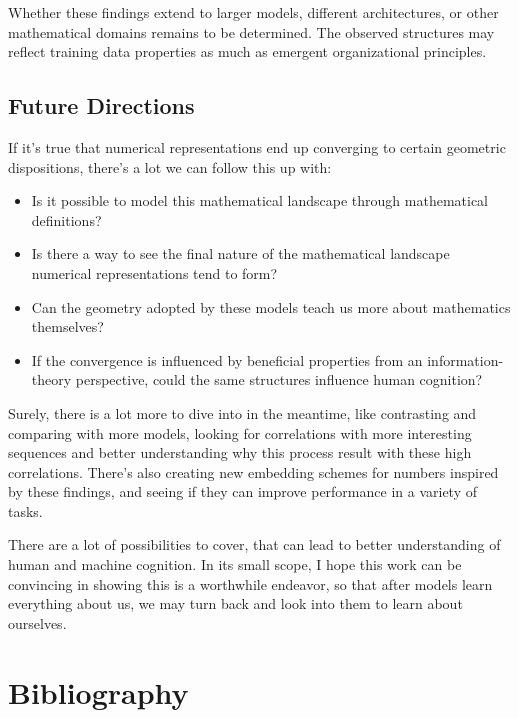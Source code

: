 \documentclass[
  a4paper, twoside, 10pt, titlepage]{book}
\providecommand{\tightlist}{%
  \setlength{\itemsep}{0pt}\setlength{\parskip}{0pt}}
\begin{document}
Whether these findings extend to larger models, different architectures,
or other mathematical domains remains to be determined. The observed
structures may reflect training data properties as much as emergent
organizational principles.

\section{Future Directions}\label{future-directions}

If it's true that numerical representations end up converging to certain
geometric dispositions, there's a lot we can follow this up with:

\begin{itemize}
\tightlist
\item
  Is it possible to model this mathematical landscape through
  mathematical definitions?
\item
  Is there a way to see the final nature of the mathematical landscape
  numerical representations tend to form?
\item
  Can the geometry adopted by these models teach us more about
  mathematics themselves?
\item
  If the convergence is influenced by beneficial properties from an
  information-theory perspective, could the same structures influence
  human cognition?
\end{itemize}

Surely, there is a lot more to dive into in the meantime, like
contrasting and comparing with more models, looking for correlations
with more interesting sequences and better understanding why this
process result with these high correlations. There's also creating new
embedding schemes for numbers inspired by these findings, and seeing if
they can improve performance in a variety of tasks.

There are a lot of possibilities to cover, that can lead to better
understanding of human and machine cognition. In its small scope, I hope
this work can be convincing in showing this is a worthwhile endeavor, so
that after models learn everything about us, we may turn back and look
into them to learn about ourselves.

\chapter*{Bibliography}\label{bibliography}
\end{document}
